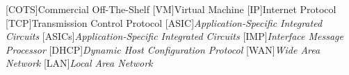 [COTS]{Commercial Off-The-Shelf}
[VM]{Virtual Machine}
[IP]{Internet Protocol}
[TCP]{Transmission Control Protocol}
[ASIC]{\textit{Application-Specific Integrated Circuits}}
[ASICs]{\textit{Application-Specific Integrated Circuits}}
[IMP]{\textit{Interface Message Processor}}
[DHCP]{\textit{Dynamic Host Configuration Protocol}}
[WAN]{\textit{Wide Area Network}}
[LAN]{\textit{Local Area Network}}
